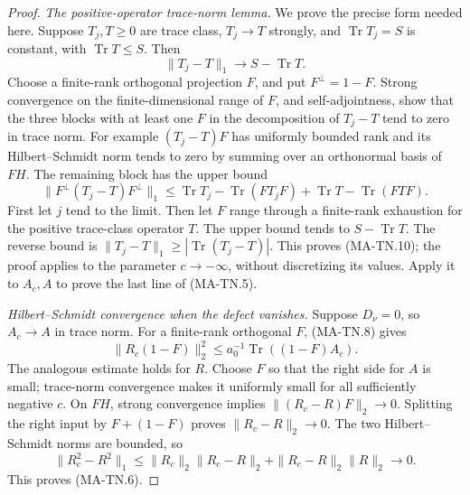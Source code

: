 \begin{proof}
\emph{The positive-operator trace-norm lemma.}
We prove the precise form needed here.  Suppose \(T_j,T\ge0\)
are trace class, \(T_j\to T\) strongly, and
\(\operatorname{Tr}T_j=S\) is constant, with
\(\operatorname{Tr}T\le S\).  Then
\[
             \|T_j-T\|_1\longrightarrow S-\operatorname{Tr}T.
 \tag{MA-TN.10}
\]
Choose a finite-rank orthogonal projection \(F\), and put
\(F^\perp=1-F\).  Strong convergence on the finite-dimensional
range of \(F\), and self-adjointness, show that the three
blocks with at least one \(F\) in the decomposition of
\(T_j-T\) tend to zero in trace norm.  For example
\((T_j-T)F\) has uniformly bounded rank and its
Hilbert--Schmidt norm tends to zero by summing over an
orthonormal basis of \(FH\).
The remaining block has the upper bound
\[
 \|F^\perp(T_j-T)F^\perp\|_1
 \le \operatorname{Tr}T_j-\operatorname{Tr}(FT_jF)
       +\operatorname{Tr}T-\operatorname{Tr}(FTF).
 \tag{MA-TN.11}
\]
First let \(j\) tend to the limit.  Then let \(F\) range
through a finite-rank exhaustion for the positive trace-class
operator \(T\).  The upper bound tends to
\(S-\operatorname{Tr}T\).  The reverse bound is
\(\|T_j-T\|_1\ge|\operatorname{Tr}(T_j-T)|\).
This proves (MA-TN.10); the proof applies to the parameter
\(c\to-\infty\), without discretizing its values.
Apply it to \(A_c,A\) to prove the last line of (MA-TN.5).

\emph{Hilbert--Schmidt convergence when the defect vanishes.}
Suppose \(D_\nu=0\), so \(A_c\to A\) in trace norm.
For a finite-rank orthogonal \(F\), (MA-TN.8) gives
\[
 \|R_c(1-F)\|_2^2
       \le a_0^{-1}\operatorname{Tr}((1-F)A_c).
 \tag{MA-TN.12}
\]
The analogous estimate holds for \(R\).
Choose \(F\) so that the right side for \(A\) is small;
trace-norm convergence makes it uniformly small for all
sufficiently negative \(c\).  On \(FH\), strong convergence
implies \(\|(R_c-R)F\|_2\to0\).  Splitting the right input
by \(F+(1-F)\) proves \(\|R_c-R\|_2\to0\).
The two Hilbert--Schmidt norms are bounded, so
\[
 \|R_c^2-R^2\|_1
   \le \|R_c\|_2\|R_c-R\|_2
             +\|R_c-R\|_2\|R\|_2\longrightarrow0 .
 \tag{MA-TN.13}
\]
This proves (MA-TN.6).
\end{proof}

